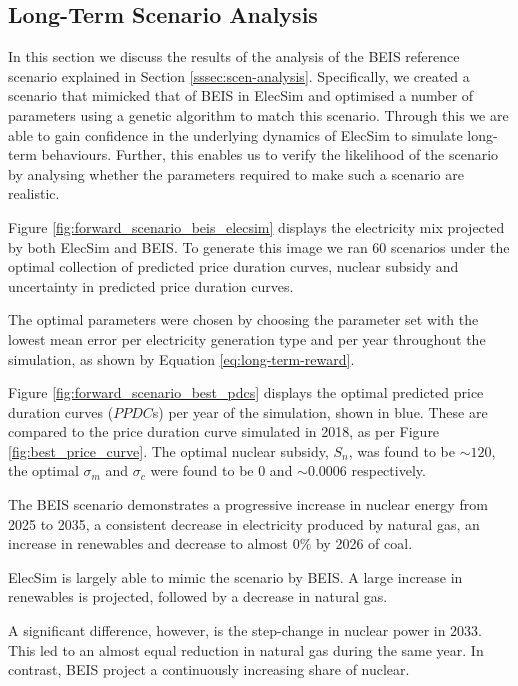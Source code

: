 \subsection{Long-Term Scenario Analysis}

In this section we discuss the results of the analysis of the BEIS reference scenario explained in Section \ref{sssec:scen-analysis}. Specifically, we created a scenario that mimicked that of BEIS in ElecSim and optimised a number of parameters using a genetic algorithm to match this scenario. Through this we are able to gain confidence in the underlying dynamics of ElecSim to simulate long-term behaviours. Further, this enables us to verify the likelihood of the scenario by analysing whether the parameters required to make such a scenario are realistic.

Figure \ref{fig:forward_scenario_beis_elecsim} displays the electricity mix projected by both ElecSim and BEIS. To generate this image we ran 60 scenarios under the optimal collection of predicted price duration curves, nuclear subsidy and uncertainty in predicted price duration curves. 

The optimal parameters were chosen by choosing the parameter set with the lowest mean error per electricity generation type and per year throughout the simulation, as shown by Equation \ref{eq:long-term-reward}.


Figure \ref{fig:forward_scenario_best_pdcs} displays the optimal predicted price duration curves ($PPDC$s) per year of the simulation, shown in blue. These are compared to the price duration curve simulated in 2018, as per Figure \ref{fig:best_price_curve}. The optimal nuclear subsidy, $S_n$, was found to be ${\sim}$\textsterling $120$, the optimal $\sigma_m$ and $\sigma_c$ were found to be $0$ and ${\sim}0.0006$ respectively.

The BEIS scenario demonstrates a progressive increase in nuclear energy from 2025 to 2035, a consistent decrease in electricity produced by natural gas, an increase in renewables and decrease to almost 0\% by 2026 of coal.

ElecSim is largely able to mimic the scenario by BEIS. A large increase in renewables is projected, followed by a decrease in natural gas. 

A significant difference, however, is the step-change in nuclear power in 2033. This led to an almost equal reduction in natural gas during the same year. In contrast, BEIS project a continuously increasing share of nuclear. 

